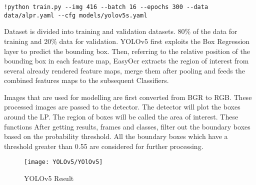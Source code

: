 \begin{lstlisting}
!python train.py --img 416 --batch 16 --epochs 300 --data data/alpr.yaml --cfg models/yolov5s.yaml
\end{lstlisting}

Dataset is divided into training and validation datasets. 80\% of the data for training and 20\% data for validation.
YOLOv5 first exploits the Box Regression layer to predict the bounding box. Then, referring to the relative position of the bounding box in each feature map, EasyOcr extracts the region of interest from several already rendered feature maps, merge them after pooling and feeds the combined features maps to the subsequent Classifiers.

Images that are used for modelling are first converted from BGR to RGB. These processed images are passed to the detector. The detector will plot the boxes around the LP. The region of boxes will be called the area of interest. These functions After getting results, frames and classes, filter out the boundary boxes based on the probability threshold. All the boundary boxes which have a threshold greater than 0.55 are considered for further processing.


\begin{figure}[h!]
	\centering
	\texttt{[image: YOLOv5/YOlOv5]}
	\caption{YOLOv5 Result}
\end{figure}













